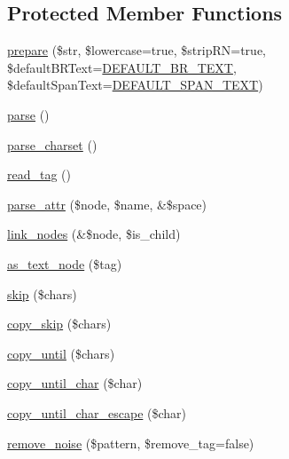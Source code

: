 \subsection*{Protected Member Functions}
\begin{DoxyCompactItemize}
\item 
\hyperlink{classsimple__html__dom_a5c2e8093a84d64af2fdcbd9116a297d1}{prepare} (\$str, \$lowercase=true, \$strip\+RN=true, \$default\+B\+R\+Text=\hyperlink{simple__html__dom_8php_a898bdf60fe4d05c1c50013eed5e2c6e8}{D\+E\+F\+A\+U\+L\+T\+\_\+\+B\+R\+\_\+\+T\+E\+XT}, \$default\+Span\+Text=\hyperlink{simple__html__dom_8php_a30d58d7d3a53efc61f064b53a434bafe}{D\+E\+F\+A\+U\+L\+T\+\_\+\+S\+P\+A\+N\+\_\+\+T\+E\+XT})
\item 
\hyperlink{classsimple__html__dom_a38d99acc70a1d8fd8f94455743b2d237}{parse} ()
\item 
\hyperlink{classsimple__html__dom_a519f20b58429f11fb3c3839efcc7f484}{parse\+\_\+charset} ()
\item 
\hyperlink{classsimple__html__dom_a11913c53d09e73dc367062ee54abde20}{read\+\_\+tag} ()
\item 
\hyperlink{classsimple__html__dom_a6d54ee34e0f121005da327b6fe0ab7e4}{parse\+\_\+attr} (\$node, \$name, \&\$space)
\item 
\hyperlink{classsimple__html__dom_a19edb141f64d5d085874f2e75e0aa333}{link\+\_\+nodes} (\&\$node, \$is\+\_\+child)
\item 
\hyperlink{classsimple__html__dom_a17ff0dd434a94d34972e3c90fbd0d545}{as\+\_\+text\+\_\+node} (\$tag)
\item 
\hyperlink{classsimple__html__dom_a83de9b35df2e0857f2b0be5bff3e4960}{skip} (\$chars)
\item 
\hyperlink{classsimple__html__dom_a48081dad72c2e828f05ae7420d95c820}{copy\+\_\+skip} (\$chars)
\item 
\hyperlink{classsimple__html__dom_a607299237161af9369abc2d2605715d5}{copy\+\_\+until} (\$chars)
\item 
\hyperlink{classsimple__html__dom_a0dcd73e05f3cee1eafe3ec6fa347c36b}{copy\+\_\+until\+\_\+char} (\$char)
\item 
\hyperlink{classsimple__html__dom_a2df9f8464f8daf439f9fa740ebdc0ede}{copy\+\_\+until\+\_\+char\+\_\+escape} (\$char)
\item 
\hyperlink{classsimple__html__dom_a5bf6f05cd9b47a87912de85a6a556b6b}{remove\+\_\+noise} (\$pattern, \$remove\+\_\+tag=false)
\end{DoxyCompactItemize}
